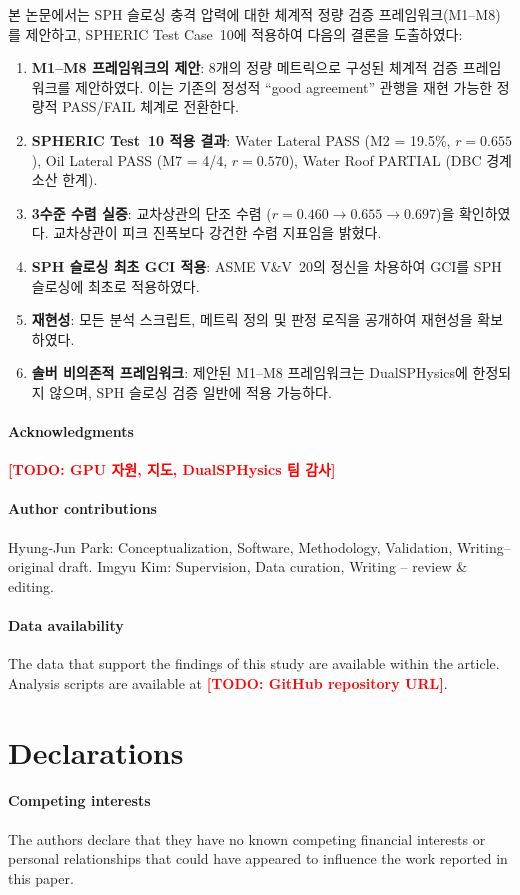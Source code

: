 \documentclass[11pt]{article}
\newcommand{\TODO}[1]{\textcolor{red}{\textbf{[TODO: #1]}}}
\begin{document}
본 논문에서는 SPH 슬로싱 충격 압력에 대한 체계적 정량 검증 프레임워크(M1--M8)를
제안하고, SPHERIC Test Case~10에 적용하여 다음의 결론을 도출하였다:

\begin{enumerate}
    \item \textbf{M1--M8 프레임워크의 제안}: 8개의 정량 메트릭으로 구성된
          체계적 검증 프레임워크를 제안하였다. 이는 기존의 정성적 ``good agreement''
          관행을 재현 가능한 정량적 PASS/FAIL 체계로 전환한다.

    \item \textbf{SPHERIC Test~10 적용 결과}: Water Lateral PASS
          (M2 = 19.5\%, $r = 0.655$), Oil Lateral PASS (M7 = 4/4, $r = 0.570$),
          Water Roof PARTIAL (DBC 경계 소산 한계).

    \item \textbf{3수준 수렴 실증}: 교차상관의 단조 수렴
          ($r = 0.460 \to 0.655 \to 0.697$)을 확인하였다.
          교차상관이 피크 진폭보다 강건한 수렴 지표임을 밝혔다.

    \item \textbf{SPH 슬로싱 최초 GCI 적용}: ASME V\&V~20의 정신을 차용하여
          GCI를 SPH 슬로싱에 최초로 적용하였다.

    \item \textbf{재현성}: 모든 분석 스크립트, 메트릭 정의 및 판정 로직을
          공개하여 재현성을 확보하였다.

    \item \textbf{솔버 비의존적 프레임워크}: 제안된 M1--M8 프레임워크는
          DualSPHysics에 한정되지 않으며, SPH 슬로싱 검증 일반에 적용 가능하다.
\end{enumerate}


\paragraph{Acknowledgments}
\TODO{GPU 자원, 지도, DualSPHysics 팀 감사}

\paragraph{Author contributions}
Hyung-Jun Park: Conceptualization, Software, Methodology, Validation, Writing--original draft.
Imgyu Kim: Supervision, Data curation, Writing -- review \& editing.

\paragraph{Data availability} The data that support the findings of this study are available within the article. Analysis scripts are available at \TODO{GitHub repository URL}.

\section*{Declarations}
\paragraph{Competing interests} The authors declare that they have no known competing financial interests or personal relationships that could have appeared to influence the work reported in this paper.


\printbibliography
\end{document}

